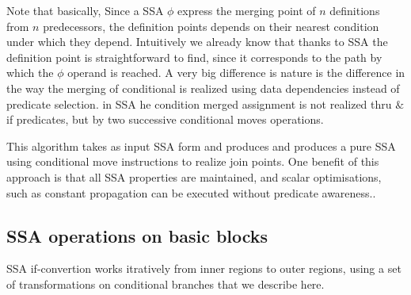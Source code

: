 Note that basically, Since a SSA $\phi$ express the merging point of $n$ definitions from $n$ predecessors, the definition points depends on their nearest condition under which they depend. Intuitively we already know that thanks to SSA the definition point is straightforward to find, since it corresponds to the path by which the $\phi$ operand is reached. 
A very big difference is nature is the difference in the way the merging of conditional is realized using data dependencies instead of predicate selection. in SSA he condition merged assignment is not realized thru $\&$ if predicates, but by two successive conditional moves operations.

This algorithm takes as input SSA form and produces and produces a pure SSA using conditional move instructions to realize join points. One benefit of this approach is that all SSA properties are maintained, and scalar optimisations, such as constant propagation can be executed without predicate awareness..

\subsection{SSA operations on basic blocks}

SSA if-convertion works itratively from inner regions to outer regions, using a set of transformations on conditional branches that we describe here.

